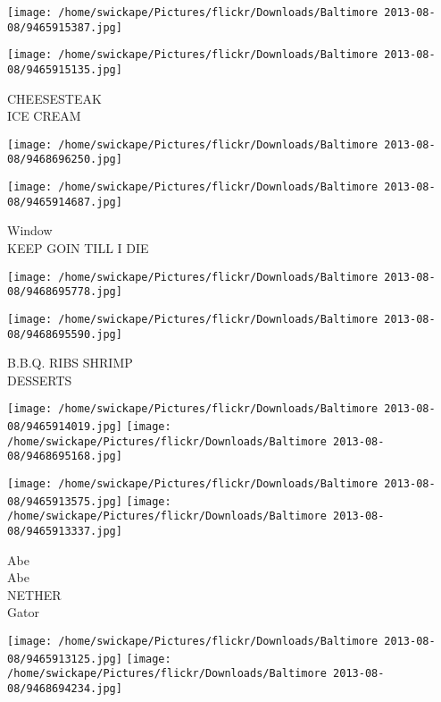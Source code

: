 \documentclass[10pt,letterpaper]{article}
\begin{document}
\texttt{[image: /home/swickape/Pictures/flickr/Downloads/Baltimore 2013-08-08/9465915387.jpg]}

\vspace{0.25in}
\texttt{[image: /home/swickape/Pictures/flickr/Downloads/Baltimore 2013-08-08/9465915135.jpg]}

CHEESESTEAK\\
ICE CREAM\\
\pagebreak

\texttt{[image: /home/swickape/Pictures/flickr/Downloads/Baltimore 2013-08-08/9468696250.jpg]}

\vspace{0.25in}
\texttt{[image: /home/swickape/Pictures/flickr/Downloads/Baltimore 2013-08-08/9465914687.jpg]}

Window\\
KEEP GOIN TILL I DIE\\
\pagebreak

\texttt{[image: /home/swickape/Pictures/flickr/Downloads/Baltimore 2013-08-08/9468695778.jpg]}

\vspace{0.25in}
\texttt{[image: /home/swickape/Pictures/flickr/Downloads/Baltimore 2013-08-08/9468695590.jpg]}

B.B.Q. RIBS SHRIMP\\
DESSERTS\\
\pagebreak

\texttt{[image: /home/swickape/Pictures/flickr/Downloads/Baltimore 2013-08-08/9465914019.jpg]}
\texttt{[image: /home/swickape/Pictures/flickr/Downloads/Baltimore 2013-08-08/9468695168.jpg]}

\texttt{[image: /home/swickape/Pictures/flickr/Downloads/Baltimore 2013-08-08/9465913575.jpg]}
\texttt{[image: /home/swickape/Pictures/flickr/Downloads/Baltimore 2013-08-08/9465913337.jpg]}

Abe\\
Abe\\
NETHER\\
Gator\\
\pagebreak

\texttt{[image: /home/swickape/Pictures/flickr/Downloads/Baltimore 2013-08-08/9465913125.jpg]}
\texttt{[image: /home/swickape/Pictures/flickr/Downloads/Baltimore 2013-08-08/9468694234.jpg]}
\end{document}
